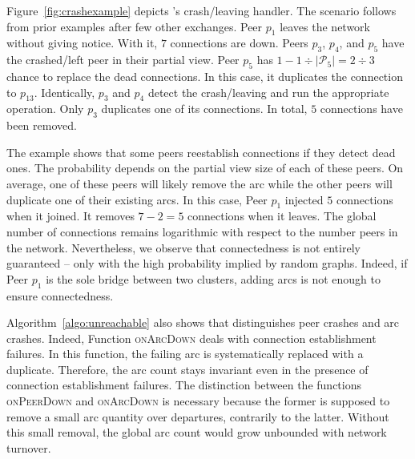 Figure~\ref{fig:crashexample} depicts \SPRAY's crash/leaving handler. The
scenario follows from prior examples after few other exchanges. Peer $p_1$
leaves the network without giving notice. With it, $7$ connections are
down. Peers $p_3$, $p_4$, and $p_5$ have the crashed/left peer in their partial
view. Peer $p_5$ has $1-{1\div{|\mathcal{P}_5|}}={2\div{3}}$ chance to replace
the dead connections. In this case, it duplicates the connection to
$p_{13}$. Identically, $p_3$ and $p_4$ detect the crash/leaving and run the
appropriate operation. Only $p_3$ duplicates one of its connections. In total,
$5$ connections have been removed.


\begin{figure*}
  \centering
  \hspace{10pt}
  \hspace{10pt}
  \caption{\label{fig:crashexample}Example of the crash/leaving
    handler of \SPRAY. }
\end{figure*}

The example shows that some peers reestablish connections if they
detect dead ones. The probability depends on the partial view size of
each of these peers. On average, one of these peers will likely remove
the arc while the other peers will duplicate one of their existing
arcs. In this case, Peer $p_1$ injected $5$ connections when it
joined. It removes $7-2 =5 $ connections when it leaves. The global
number of connections remains logarithmic with respect to the number
peers in the network. Nevertheless, we observe that connectedness is
not entirely guaranteed -- only with the high probability implied by
random graphs. Indeed, if Peer $p_1$ is the sole bridge between two
clusters, adding arcs is not enough to ensure connectedness.

Algorithm~\ref{algo:unreachable} also shows that \SPRAY distinguishes peer
crashes and arc crashes. Indeed, Function \textsc{onArcDown} deals with
connection establishment failures. In this function, the failing arc is
systematically replaced with a duplicate. Therefore, the arc count stays
invariant even in the presence of connection establishment failures. The
distinction between the functions \textsc{onPeerDown} and \textsc{onArcDown} is
necessary because the former is supposed to remove a small arc quantity over
departures, contrarily to the latter. Without this small removal, the global arc
count would grow unbounded with network turnover.

